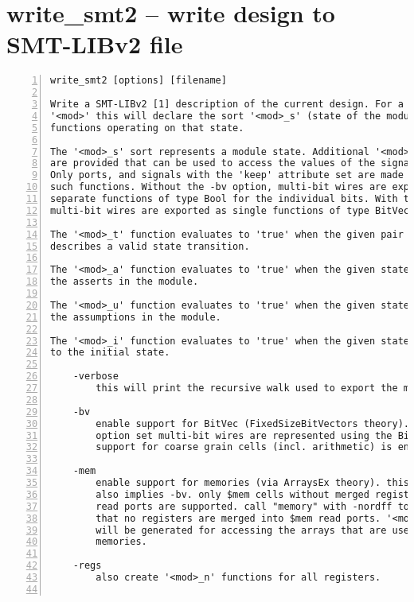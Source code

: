 \section{write\_smt2 -- write design to SMT-LIBv2 file}
\label{cmd:write_smt2}
\begin{lstlisting}[numbers=left,frame=single]
    write_smt2 [options] [filename]

Write a SMT-LIBv2 [1] description of the current design. For a module with name
'<mod>' this will declare the sort '<mod>_s' (state of the module) and the
functions operating on that state.

The '<mod>_s' sort represents a module state. Additional '<mod>_n' functions
are provided that can be used to access the values of the signals in the module.
Only ports, and signals with the 'keep' attribute set are made available via
such functions. Without the -bv option, multi-bit wires are exported as
separate functions of type Bool for the individual bits. With the -bv option
multi-bit wires are exported as single functions of type BitVec.

The '<mod>_t' function evaluates to 'true' when the given pair of states
describes a valid state transition.

The '<mod>_a' function evaluates to 'true' when the given state satisfies
the asserts in the module.

The '<mod>_u' function evaluates to 'true' when the given state satisfies
the assumptions in the module.

The '<mod>_i' function evaluates to 'true' when the given state conforms
to the initial state.

    -verbose
        this will print the recursive walk used to export the modules.

    -bv
        enable support for BitVec (FixedSizeBitVectors theory). with this
        option set multi-bit wires are represented using the BitVec sort and
        support for coarse grain cells (incl. arithmetic) is enabled.

    -mem
        enable support for memories (via ArraysEx theory). this option
        also implies -bv. only $mem cells without merged registers in
        read ports are supported. call "memory" with -nordff to make sure
        that no registers are merged into $mem read ports. '<mod>_m' functions
        will be generated for accessing the arrays that are used to represent
        memories.

    -regs
        also create '<mod>_n' functions for all registers.


\end{lstlisting}
